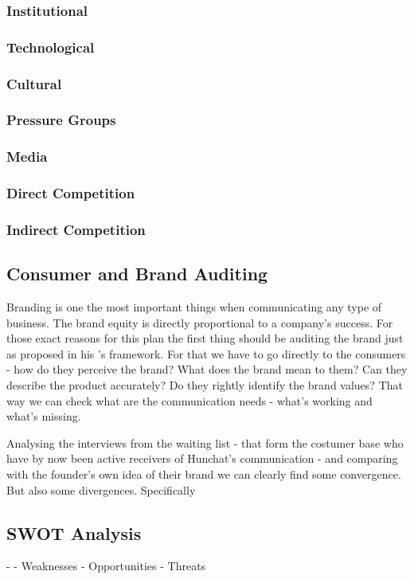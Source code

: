 \documentclass[12pt]{article}
\begin{document}
	\subsubsection{Institutional}
	\subsubsection{Technological}
	\subsubsection{Cultural}
	\subsubsection{Pressure Groups}
	\subsubsection{Media}
	\subsubsection{Direct Competition}
	\subsubsection{Indirect Competition}
	
\subsection{Consumer and Brand Auditing}
Branding is one the most important things when communicating any type of business. The brand equity is directly proportional to a company's success. For those exact reasons for this plan the first thing should be auditing the brand just as \citeauthor{kliatchko} proposed in his \citeyear{kliatchko}'s framework. For that we have to go directly to the consumers - how do they perceive the brand? What does the brand mean to them? Can they describe the product accurately? Do they rightly identify the brand values? That way we can check what are the communication needs - what's working and what's missing.

Analysing the interviews from the waiting list - that form the costumer base who have by now been active receivers of Hunchat's communication - and comparing with the founder's own idea of their brand we can clearly find some convergence. %
But also some divergences. Specifically

\subsection{SWOT Analysis}
- 
- Weaknesses
- Opportunities
- Threats
\end{document}
